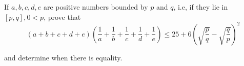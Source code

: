 If $ a,b,c,d,e$ are positive numbers bounded by $ p$ and $ q$,  i.e, if they lie in $ [p,q], 0 < p$,  prove that\[ (a + b + c + d + e)\left(\frac {1}{a} + \frac {1}{b} + \frac {1}{c} + \frac {1}{d} + \frac {1}{e}\right) \le 25 + 6\left(\sqrt {\frac {p}{q}} - \sqrt {\frac {q}{p}}\right)^2\]

and determine when there is equality.